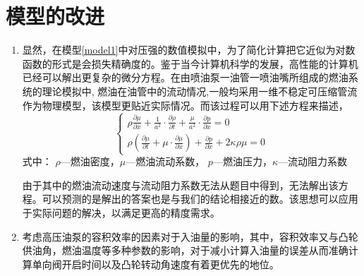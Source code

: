 \documentclass[withoutpreface,bwprint]{cumcmthesis} %
\begin{document}
\section{模型的改进}
\begin{enumerate}
	\item 显然，在模型\cref{model1}中对压强的数值模拟中，为了简化计算把它近似为对数函数的形式是会损失精确度的。鉴于当今计算机科学的发展，高性能的计算机已经可以解出更复杂的微分方程。在由喷油泵一油管一喷油嘴所组成的燃油系统的理论模拟中, 燃油在油管中的流动情况,一般均采用一维不稳定可压缩管流作为物理模型，该模型更贴近实际情况。而该过程可以用下述方程来描述，
	\begin{equation}
	\begin{cases}
	\rho\frac{\partial \mu}{\partial x}+\frac{1}{a^{2}}\cdot\frac{\partial \rho}{\partial t}+\frac{\mu}{a^{2}}\cdot\frac{\partial p}{\partial x} = 0\\
	\rho\left(\frac{\partial \mu}{\partial t}+\mu\cdot \frac{\partial \mu}{\partial x}\right)+\frac{\partial p}{\partial x}+2\kappa\rho\mu = 0
	\end{cases}\label{eq:ques6-1}	
	\end{equation}
	式中： $\rho$—燃油密度，$\mu$—燃油流动系数，
	$p$—燃油压力，$\kappa$—流动阻力系数
	
	由于其中的燃油流动速度与流动阻力系数无法从题目中得到，无法解出该方程。可以预测的是解出的答案也是与我们的结论相接近的数。该思想可以应用于实际问题的解决，以满足更高的精度需求。
	
	\item 考虑高压油泵的容积效率的因素对于入油量的影响，其中，容积效率又与凸轮供油角，燃油温度等多种参数的影响，对于减小计算入油量的误差从而准确计算单向阀开启时间以及凸轮转动角速度有着更优先的地位。

\end{enumerate}
\end{document}
